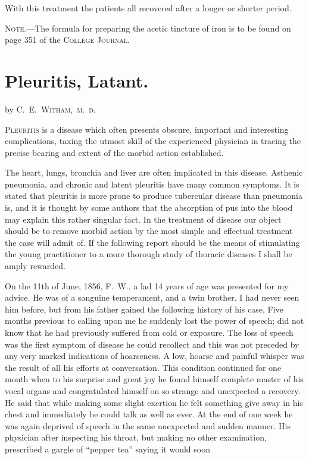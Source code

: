 
With this treatment the patients all recovered after a longer or shorter
period.

\textsc{Note.---}The formula for preparing the acetic tincture of iron is to be
found on page 351 of the \textsc{College Journal}.

\section*{Pleuritis, Latant.}

by \textsc{C.~E.~Witham,\ m.~d.}

\textsc{Pleuritis} is a disease which often presents obscure, important and interesting
complications, taxing the utmost skill of the experienced physician
in tracing the precise bearing and extent of the morbid action
established.

The heart, lungs, bronchia and liver are often implicated in this disease.
Asthenic pneumonia, and chronic and latent pleuritis have many common
symptoms. It is stated that pleuritis is more prone to produce
tubercular disease than pneumonia is, and it is thought by some authors
that the absorption of pus into the blood may explain this rather singular
fact. In the treatment of disease our object should be to remove
morbid action by the most simple and effectual treatment the case will
admit of. If the following report should be the means of stimulating
the young practitioner to a more thorough study of thoracic diseases I
shall be amply rewarded.

On the 11th of June, 1856, F.~W., a lad 14 years of age was presented
for my advice. He was of a sanguine temperament, and a twin brother.
I had never seen him before, but from his father gained the following
history of his case. Five months previous to calling upon me he suddenly
lost the power of speech; did not know that he had previously
suffered from cold or exposure. The loss of speech was the first symptom
of disease he could recollect and this was not preceded by any
very marked indications of hoarseness. A low, hoarse and painful
whisper was the result of all his efforts at conversation. This condition
continued for one month when to his surprise and great joy he found
himself complete master of his vocal organs and congratulated himself
on so strange and unexpected a recovery. He said that while making
some slight exertion he felt something give away in his chest and immediately
he could talk as well as ever. At the end of one week he
was again deprived of speech in the same unexpected and sudden manner.
His physician after inspecting his throat, but making no other
examination, prescribed a gargle of ``pepper tea'' saying it would soon\endinput

